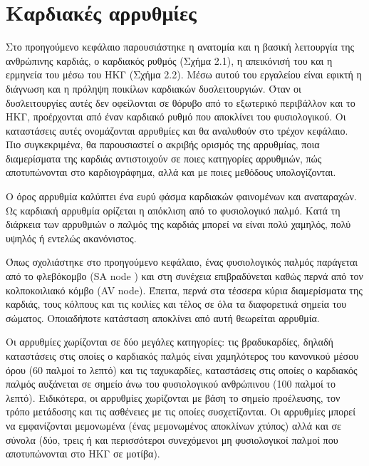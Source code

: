 \gr
\chapter{Καρδιακές αρρυθμίες}
Στο προηγούμενο κεφάλαιο παρουσιάστηκε η ανατομία και η βασική λειτουργία της ανθρώπινης καρδιάς, ο καρδιακός ρυθμός (Σχήμα 2.1), η απεικόνισή του και η ερμηνεία του μέσω του ΗΚΓ (Σχήμα 2.2). Μέσω αυτού του εργαλείου είναι εφικτή η διάγνωση και η πρόληψη ποικίλων καρδιακών δυσλειτουργιών. Όταν οι δυσλειτουργίες αυτές δεν οφείλονται σε θόρυβο από το εξωτερικό περιβάλλον και το ΗΚΓ, προέρχονται από έναν καρδιακό ρυθμό που αποκλίνει του φυσιολογικού. Οι καταστάσεις αυτές ονομάζονται αρρυθμίες και θα αναλυθούν στο τρέχον κεφάλαιο. Πιο συγκεκριμένα, θα παρουσιαστεί ο ακριβής ορισμός της αρρυθμίας, ποια διαμερίσματα της καρδιάς αντιστοιχούν σε ποιες κατηγορίες αρρυθμιών, πώς αποτυπώνονται στο καρδιογράφημα, αλλά και με ποιες μεθόδους υπολογίζονται. \par
Ο όρος αρρυθμία καλύπτει ένα ευρύ φάσμα καρδιακών φαινομένων και αναταραχών. Ως καρδιακή αρρυθμία ορίζεται η απόκλιση από το φυσιολογικό παλμό. Κατά τη διάρκεια των αρρυθμιών ο παλμός της καρδιάς μπορεί να είναι πολύ χαμηλός, πολύ υψηλός ή εντελώς ακανόνιστος. 
\par
Όπως σχολιάστηκε στο προηγούμενο κεφάλαιο, ένας φυσιολογικός παλμός παράγεται από το φλεβόκομβο (\en SA node \gr) και στη συνέχεια επιβραδύνεται καθώς περνά από τον κολποκοιλιακό κόμβο (\en AV node\gr ). Έπειτα, περνά στα τέσσερα κύρια διαμερίσματα της καρδιάς, τους κόλπους και τις κοιλίες και τέλος σε όλα τα διαφορετικά σημεία του σώματος. Οποιαδήποτε κατάσταση αποκλίνει από αυτή θεωρείται αρρυθμία.
\par
Οι αρρυθμίες χωρίζονται σε δύο μεγάλες κατηγορίες: τις βραδυκαρδίες, δηλαδή καταστάσεις στις οποίες ο καρδιακός παλμός είναι χαμηλότερος του κανονικού μέσου όρου (60 παλμοί το λεπτό) και τις ταχυκαρδίες, καταστάσεις στις οποίες ο καρδιακός παλμός αυξάνεται σε σημείο άνω του φυσιολογικού ανθρώπινου (100 παλμοί το λεπτό). Ειδικότερα, οι αρρυθμίες χωρίζονται με βάση το σημείο προέλευσης, τον τρόπο μετάδοσης και τις ασθένειες με τις οποίες συσχετίζονται. Οι αρρυθμίες μπορεί να εμφανίζονται μεμονωμένα (ένας μεμονωμένος αποκλίνων χτύπος) αλλά και σε σύνολα (δύο, τρεις ή και περισσότεροι συνεχόμενοι μη φυσιολογικοί παλμοί που αποτυπώνονται στο ΗΚΓ σε μοτίβα). 
\par
